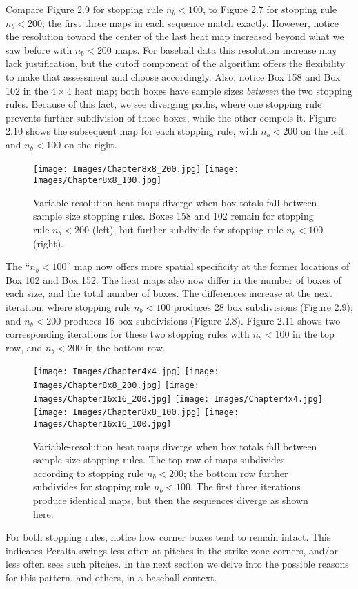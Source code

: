 Compare Figure 2.9 for stopping rule $n_{b} < 100$, to Figure 2.7 for stopping rule $n_{b} < 200$; the first three maps in each sequence match exactly. However, notice the resolution toward the center of the last heat map increased beyond what we saw before with $n_{b} < 200$ maps. For baseball data this resolution increase may lack justification, but the cutoff component of the algorithm offers the flexibility to make that assessment and choose accordingly. Also, notice Box 158 and Box 102 in the $4 \times 4$ heat map; both boxes have sample sizes {\it between} the two stopping rules. Because of this fact, we see diverging paths, where one stopping rule prevents further subdivision of those boxes, while the other compels it. Figure 2.10 shows the subsequent map for each stopping rule, with $n_{b} < 200$ on the left, and $n_{b} < 100$ on the right.
        \begin{figure}[H]
      	\centering      
      	\texttt{[image: Images/Chapter8x8\_200.jpg]}
      	\texttt{[image: Images/Chapter8x8\_100.jpg]}
      	\caption{Variable-resolution heat maps diverge when box totals fall between sample size stopping rules. Boxes 158 and 102 remain for stopping rule $n_{b} < 200$ (left), but further subdivide for stopping rule $n_{b} < 100$ (right).}
\end{figure} 
The ``$n_{b} < 100$'' map now offers more spatial specificity at the former locations of Box 102 and Box 152. The heat maps also now differ in the number of boxes of each size, and the total number of boxes.  The differences increase at the next iteration, where stopping rule $n_{b} < 100$ produces 28 box subdivisions (Figure 2.9); and $n_{b} < 200$ produces 16 box subdivisions (Figure 2.8). Figure 2.11 shows two corresponding iterations for these two stopping rules with $n_{b} < 100$ in the top row, and $n_{b} < 200$ in the bottom row.
        \begin{figure}[H]
      	\centering      
      	\texttt{[image: Images/Chapter4x4.jpg]}
      	\texttt{[image: Images/Chapter8x8\_200.jpg]}
      	\texttt{[image: Images/Chapter16x16\_200.jpg]}
      	\texttt{[image: Images/Chapter4x4.jpg]}
      	\texttt{[image: Images/Chapter8x8\_100.jpg]}
      	\texttt{[image: Images/Chapter16x16\_100.jpg]}
      	\caption{Variable-resolution heat maps diverge when box totals fall between sample size stopping rules. The top row of maps subdivides according to stopping rule $n_{b} < 200$; the bottom row further subdivides for stopping rule $n_{b} < 100$. The first three iterations produce identical maps, but then the sequences diverge as shown here.}
\end{figure}
For both stopping rules, notice how corner boxes tend to remain intact. This indicates Peralta swings less often at pitches in the strike zone corners, and/or less often sees such pitches. In the next section we delve into the possible reasons for this pattern, and others, in a baseball context.


